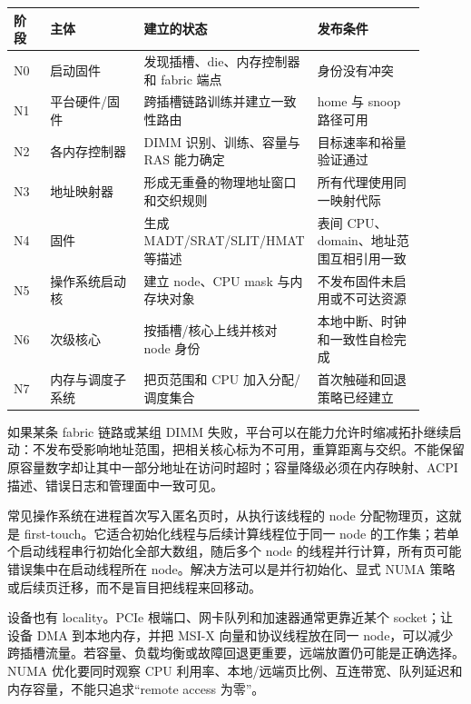 \begin{longtable}{L{0.09\linewidth}L{0.24\linewidth}L{0.30\linewidth}L{0.27\linewidth}}
\toprule
阶段 & 主体 & 建立的状态 & 发布条件 \\
\midrule
N0 & 启动固件 & 发现插槽、die、内存控制器和 fabric 端点 & 身份没有冲突 \\\tablerowrule
N1 & 平台硬件/固件 & 跨插槽链路训练并建立一致性路由 & home 与 snoop 路径可用 \\\tablerowrule
N2 & 各内存控制器 & DIMM 识别、训练、容量与 RAS 能力确定 & 目标速率和裕量验证通过 \\\tablerowrule
N3 & 地址映射器 & 形成无重叠的物理地址窗口和交织规则 & 所有代理使用同一映射代际 \\\tablerowrule
N4 & 固件 & 生成 MADT/SRAT/SLIT/HMAT 等描述 & 表间 CPU、domain、地址范围互相引用一致 \\\tablerowrule
N5 & 操作系统启动核 & 建立 node、CPU mask 与内存块对象 & 不发布固件未启用或不可达资源 \\\tablerowrule
N6 & 次级核心 & 按插槽/核心上线并核对 node 身份 & 本地中断、时钟和一致性自检完成 \\\tablerowrule
N7 & 内存与调度子系统 & 把页范围和 CPU 加入分配/调度集合 & 首次触碰和回退策略已经建立 \\
\bottomrule
\end{longtable}

如果某条 fabric 链路或某组 DIMM 失败，平台可以在能力允许时缩减拓扑继续启动：不发布受影响地址范围，把相关核心标为不可用，重算距离与交织。不能保留原容量数字却让其中一部分地址在访问时超时；容量降级必须在内存映射、ACPI 描述、错误日志和管理面中一致可见。


常见操作系统在进程首次写入匿名页时，从执行该线程的 node 分配物理页，这就是 first-touch。它适合初始化线程与后续计算线程位于同一 node 的工作集；若单个启动线程串行初始化全部大数组，随后多个 node 的线程并行计算，所有页可能错误集中在启动线程所在 node。解决方法可以是并行初始化、显式 NUMA 策略或后续页迁移，而不是盲目把线程来回移动。

设备也有 locality。PCIe 根端口、网卡队列和加速器通常更靠近某个 socket；让设备 DMA 到本地内存，并把 MSI-X 向量和协议线程放在同一 node，可以减少跨插槽流量。若容量、负载均衡或故障回退更重要，远端放置仍可能是正确选择。NUMA 优化要同时观察 CPU 利用率、本地/远端页比例、互连带宽、队列延迟和内存容量，不能只追求“remote access 为零”。

